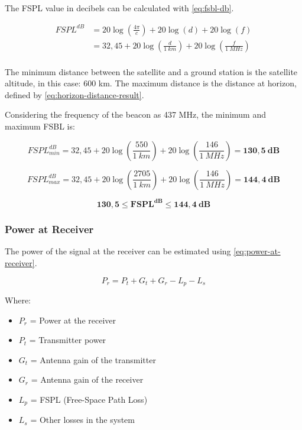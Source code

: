 The FSPL value in decibels can be calculated with \autoref{eq:fsbl-db}.

\begin{equation} \label{eq:fsbl-db}
    \begin{split}
        FSPL^{dB} & = 20\log\left(\frac{4\pi}{c}\right) + 20\log\left(d\right) + 20\log\left(f\right) \\
                  & = 32,45 + 20\log\left(\frac{d}{1\ km}\right) + 20\log\left(\frac{f}{1\ MHz}\right) \\
    \end{split}
\end{equation}

The minimum distance between the satellite and a ground station is the satellite altitude, in this case: 600 km. The maximum distance is the distance at horizon, defined by \autoref{eq:horizon-distance-result}.

Considering the frequency of the beacon as 437 MHz, the minimum and maximum FSBL is:

\begin{equation}
    FSPL^{dB}_{min} = 32,45 + 20\log\left(\frac{550}{1\ km}\right) + 20\log\left(\frac{146}{1\ MHz}\right) = \mathbf{130,5\ dB}
\end{equation}

\begin{equation}
    FSPL^{dB}_{max} = 32,45 + 20\log\left(\frac{2705}{1\ km}\right) + 20\log\left(\frac{146}{1\ MHz}\right) = \mathbf{144,4\ dB}
\end{equation}

\begin{equation}
    \mathbf{130,5 \leq FSPL^{dB} \leq 144,4\ dB}
\end{equation}

\subsubsection{Power at Receiver}

The power of the signal at the receiver can be estimated using \autoref{eq:power-at-receiver}.

\begin{equation} \label{eq:power-at-receiver}
    P_{r} = P_{t} + G_{t} + G_{r} - L_{p} - L_{s}
\end{equation}

Where:

\begin{itemize}
    \item $P_{r}$ = Power at the receiver
    \item $P_{t}$ = Transmitter power
    \item $G_{t}$ = Antenna gain of the transmitter
    \item $G_{r}$ = Antenna gain of the receiver
    \item $L_{p}$ = FSPL (Free-Space Path Loss)
    \item $L_{s}$ = Other losses in the system
\end{itemize}

